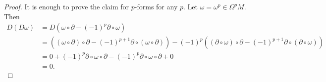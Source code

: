 \documentclass{elsarticle}
\theoremstyle{definition}
\begin{document}
\begin{proof}
  It is enough to prove the claim for $p$-forms for any $p$. Let $\omega = \omega^p \in \Omega^{p} M$. Then
  \begin{equation*}
    \begin{split}
      D(D \omega)
        & = D(\omega \circ \partial
          - (-1)^{p} \partial \circ \omega) \\
        & = ((\omega \circ \partial) \circ \partial
          - (-1)^{p + 1} \partial \circ (\omega \circ \partial))
          - (-1)^{p}((\partial \circ \omega) \circ \partial
          - (-1)^{p + 1} \partial \circ (\partial \circ \omega)) \\
        & = 0 + (-1)^{p} \partial \circ \omega \circ \partial
          - (-1)^{p} \partial \circ \omega \circ \partial + 0 \\
        & = 0.
    \end{split}
  \end{equation*}
\end{proof}
\end{document}
